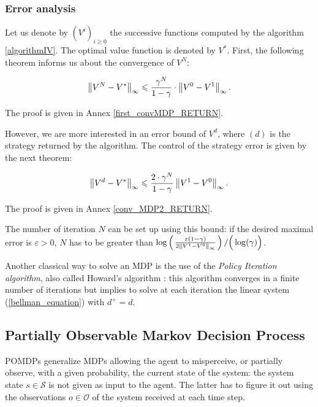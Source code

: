 \subsubsection{Error analysis}
\label{section_error_analysis}
Let us denote by $(V^i)_{i \geqslant 0}$ the successive
functions computed by the algorithm \ref{algorithmIV}.
The optimal value function is denoted by $V^*$.
First, the following theorem informs us about the convergence of $V^N$:
\begin{theorem}
\label{first_convMDP}
\begin{equation} 
\label{conv_mdp_1}
\left\lVert V^N -V^* \right\rVert_{\infty} \leqslant \frac{\gamma^N}{1-\gamma} \cdot \left\lVert  V^{0} - V^{1}  \right\rVert_{\infty}. 
\end{equation}
\end{theorem}
The proof is given in Annex \ref{first_convMDP_RETURN}.

However, we are more interested in an error bound of $V^{d}$,
where $(d)$ is the strategy returned by the algorithm.
The control of the strategy error is given by the next theorem:
\begin{theorem}
\label{conv_MDP2}
\[ \left\lVert  V^d - V^*  \right\rVert_{\infty} \leqslant \frac{2 \cdot \gamma^N}{1-\gamma} \left\lVert  V^1 - V^0  \right\rVert_{\infty}. \]
\end{theorem}
The proof is given in Annex \ref{conv_MDP2_RETURN}.

The number of iteration $N$
can be set up using this bound:
if the desired maximal error is $\varepsilon>0$,
$N$ has to be greater than 
$\log \left( \left.  \frac{ \varepsilon(1-\gamma)}{2\left\lVert V^1-V^0 \right\rVert_{\infty}} \right. \right)/\Big(\log(\gamma)\Big)$.

Another classical way to solve an MDP is the use of the
\textit{Policy Iteration algorithm},
also called Howard's algorithm \cite{puterman94}:
this algorithm converges in a finite number of iterations
but implies to solve at each iteration the linear system 
(\ref{bellman_equation}) with $d^+ = d$.

\subsection{Partially Observable Markov Decision Process} \label{section_POMDP}
POMDPs generalize MDPs
allowing the agent to misperceive, or partially observe,
with a given probability, 
the current state of the system: 
the system state $s \in \mathcal{S}$ is not given as input
to the agent.
The latter has to figure it out using
the observations $o \in \mathcal{O}$ of the system 
received at each time step.
